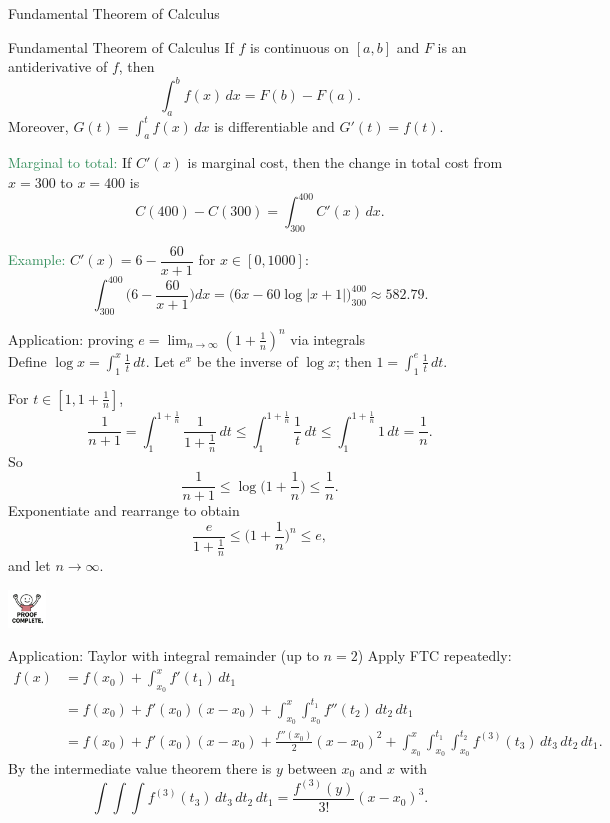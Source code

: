 \documentclass[11pt,aspectratio=169]{beamer}
\begin{document}
\begin{frame}[label=ftc]{Fundamental Theorem of Calculus}
\begin{alertblock}{Fundamental Theorem of Calculus}
If $f$ is continuous on $[a,b]$ and $F$ is an antiderivative of $f$, then
\[
\int_a^b f(x)\,dx = F(b)-F(a).
\]
Moreover, $G(t)=\int_a^t f(x)\,dx$ is differentiable and $G'(t)=f(t)$.
\end{alertblock}

\textcolor{SeaGreen}{Marginal to total:} If $C'(x)$ is marginal cost, then the change in total cost from $x=300$ to $x=400$ is
\[
C(400)-C(300)=\int_{300}^{400} C'(x)\,dx.
\]

\textcolor{SeaGreen}{Example:} $C'(x)=6-\dfrac{60}{x+1}$ for $x\in[0,1000]$:
\[
\int_{300}^{400}\!\! \Big(6-\frac{60}{x+1}\Big) dx
=\Big(6x-60\log|x+1|\Big)_{300}^{400}\approx 582.79.
\]
\end{frame}



\begin{frame}{Application: proving $e=\lim_{n\to\infty}(1+\tfrac1n)^n$ via integrals}
\ \\[-1mm]
Define $\displaystyle \log x=\int_1^x \frac{1}{t}\,dt$. Let $e^x$ be the inverse of $\log x$; then $1=\int_1^e \frac{1}{t}\,dt$.
\bigskip

For $t\in[1,1+\frac{1}{n}]$,
\[
\frac{1}{n+1}=\int_1^{1+\frac{1}{n}}\frac{1}{1+\frac{1}{n}}\,dt
\le \int_1^{1+\frac{1}{n}}\frac{1}{t}\,dt
\le \int_1^{1+\frac{1}{n}}1\,dt=\frac{1}{n}.
\]
So
\[
\frac{1}{n+1}\le \log\Big(1+\frac{1}{n}\Big)\le \frac{1}{n}.
\]
Exponentiate and rearrange to obtain
$$ 
\frac{e}{1+\frac{1}{n}}\le \Big(1+\frac{1}{n}\Big)^n \le e, 
$$
and let $n\to\infty$.

\hfill\includegraphics[width=1cm]{img/qed.jpg}
\end{frame}

\begin{frame}{Application: Taylor with integral remainder (up to $n=2$)}
Apply FTC repeatedly:
\begin{align*}
f(x)
&= f(x_0)+\int_{x_0}^x f'(t_1)\,dt_1 \\
&= f(x_0)+f'(x_0)(x-x_0)+\int_{x_0}^x\!\int_{x_0}^{t_1} f''(t_2)\,dt_2\,dt_1 \\
&= f(x_0)+f'(x_0)(x-x_0)+\frac{f''(x_0)}{2}(x-x_0)^2
+ \int_{x_0}^x\!\int_{x_0}^{t_1}\!\int_{x_0}^{t_2} f^{(3)}(t_3)\,dt_3\,dt_2\,dt_1.
\end{align*}
By the intermediate value theorem there is $y$ between $x_0$ and $x$ with
\[
\int\!\!\int\!\!\int f^{(3)}(t_3)\,dt_3\,dt_2\,dt_1
= \frac{f^{(3)}(y)}{3!}(x-x_0)^3.
\]
\end{frame}
\end{document}
